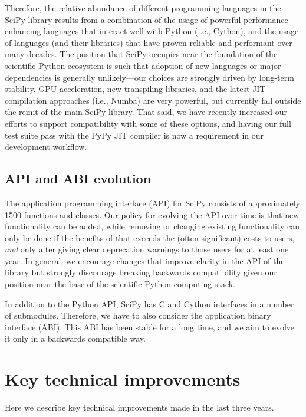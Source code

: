 \documentclass[fleqn,10pt]{wlscirep}
\begin{document}
Therefore, the relative abundance of different programming languages in the
SciPy library results from a combination of the usage of powerful performance
enhancing languages that interact well with Python (i.e., Cython), and the
usage of languages (and their libraries) that have proven reliable and
performant over many decades. The position that SciPy occupies near the
foundation of the scientific Python ecosystem is such that adoption of new
languages or major dependencies is generally unlikely---our choices are strongly
driven by long-term stability. GPU acceleration, new transpiling libraries, and
the latest JIT compilation approaches (i.e.,
Numba\cite{Lam:2015:NLP:2833157.2833162}) are very powerful, but currently fall
outside the remit of the main SciPy library. That said, we have recently
increased our efforts to support compatibility with some of these options, and
having our full test suite pass with the PyPy JIT
compiler\cite{Bolz:2009:TMP:1565824.1565827} is now a requirement in our
development workflow.

\subsection*{API and ABI evolution}

The application programming interface (API) for SciPy consists of approximately
1500 functions and classes.  Our policy for evolving the API over time is that
new functionality can be added, while removing or changing existing
functionality can only be done if the benefits of that exceeds the (often
significant) costs to users, \textit{and} only after giving clear deprecation
warnings to those users for at least one year. In general, we encourage
changes that improve clarity in the API of the library but strongly discourage
breaking backwards compatibility given our position near the base of the 
scientific Python computing stack.

In addition to the Python API, SciPy has C and Cython interfaces in a number
of submodules. Therefore, we have to also consider the application binary
interface (ABI). This ABI has been stable for a long time, and we aim to
evolve it only in a backwards compatible way.

\section*{Key technical improvements}

Here we describe key technical improvements made in the last three years.
\end{document}
